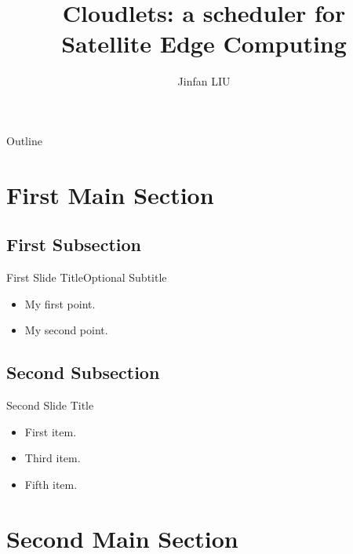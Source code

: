 \documentclass[xcolor=dvipsnames]{beamer}
\title{Cloudlets: a scheduler for\\ Satellite Edge Computing}
\subtitle{}
\author{Jinfan LIU}
\institute[National University of Singapore] %
{
    School of Computing\\
    National University of Singapore
}
\date{}
\begin{document}
\begin{frame}

    \titlepage
\end{frame}



\begin{frame}{Outline}
    \tableofcontents
\end{frame}


\section{First Main Section}

\subsection{First Subsection}
\begin{frame}{First Slide Title}{Optional Subtitle}
    \begin{itemize}
        \item {
                My first point.
            }
        \item {
                My second point.
            }
    \end{itemize}
\end{frame}

\subsection{Second Subsection}
\begin{frame}{Second Slide Title}
    \begin{itemize}
        \item {
                First item.
                \pause %
            }
        \item<3-> {
                Third item.
            }
        \item<5-> {
                Fifth item. 
            }
    \end{itemize}
\end{frame}

\section{Second Main Section}
\end{document}

